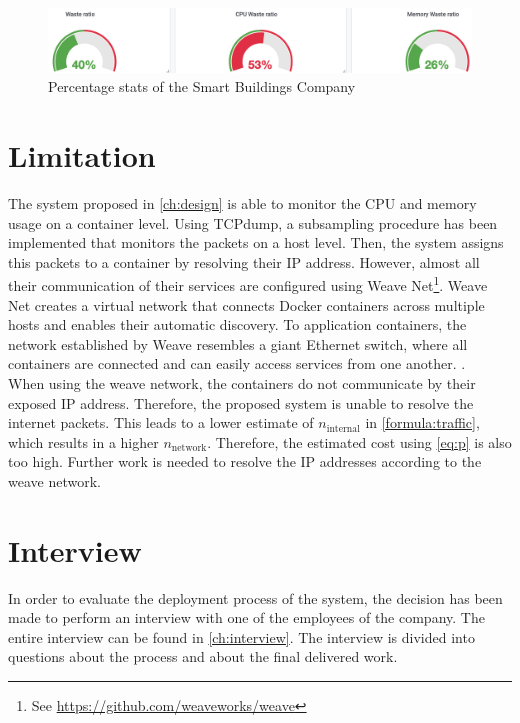 \begin{figure}
    \centering
    \includegraphics[width=\textwidth]{gfx/stats_percentage.png}
    \caption{Percentage stats of the Smart Buildings Company}
    \label{fig:stats_percentage}
\end{figure}

\section{Limitation} \label{sec:sb-limitation}
The system proposed in \autoref{ch:design} is able to monitor the CPU and memory usage on a container level. Using TCPdump, a subsampling procedure has been implemented that monitors the packets on a host level. Then, the system assigns this packets to a container by resolving their IP address. However, almost all their communication of their services are configured using Weave Net\footnote{See \url{https://github.com/weaveworks/weave}}. Weave Net creates a virtual network that connects Docker containers across multiple hosts and enables their automatic discovery. To application containers, the network established by Weave resembles a giant Ethernet switch, where all containers are connected and can easily access services from one another. \cite{weave}.\\

\noindent
When using the weave network, the containers do not communicate by their exposed IP address. Therefore, the proposed system is unable to resolve the internet packets. This leads to a lower estimate of $n_\text{internal}$ in \autoref{formula:traffic}, which results in a higher $n_\text{network}$. Therefore, the estimated cost using \autoref{eq:p} is also too high. Further work is needed to resolve the IP addresses according to the weave network.


\section{Interview} \label{sec:sb-interview}
In order to evaluate the deployment process of the system, the decision has been made to perform an interview with one of the employees of the company. The entire interview can be found in \autoref{ch:interview}. The interview is divided into questions about the process and about the final delivered work.\\

